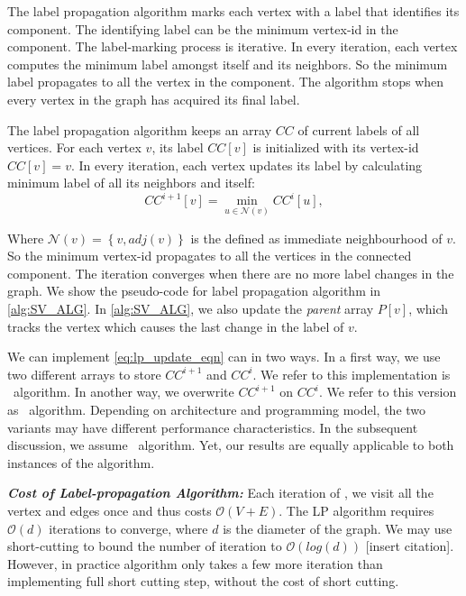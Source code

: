 \begin{table}



\end{table}

The label propagation algorithm marks each vertex with a label that identifies
its component. The identifying label can be the minimum vertex-id in the
component. The label-marking process is iterative. In every iteration, each
vertex computes the minimum label amongst itself and its neighbors. So the
minimum label propagates to all the vertex in the component. The algorithm
stops when every vertex in the graph has acquired its final label.

The label propagation algorithm keeps an array $CC$ of current labels of all
vertices. For each vertex $v$, its label $CC[v]$ is initialized with its
vertex-id $CC[v]=v$. In every iteration, each vertex updates its label by
calculating minimum label of all its neighbors and itself: 
%
\begin{equation}
CC^{i+1}[v]=\min_{u\in\mathcal{N}(v)}CC^{i}[u],\label{eq:lp_update_eqn}
\end{equation}

Where $\mathcal{N}(v)=\left\{ v,adj(v)\right\} $ is the defined as immediate
neighbourhood of $v$. So the minimum vertex-id propagates to all the vertices
in the connected component. The iteration converges when there are no more
label changes in the graph. We show the pseudo-code for label propagation algorithm in \cref{alg:SV_ALG}.
In \cref{alg:SV_ALG}, we also update the \emph{parent} array $P[v]$, which
tracks the vertex which causes the last change  in the label  of $v$. 

We can implement \cref{eq:lp_update_eqn} can in two ways. In a first way, we
use two different arrays to store $CC^{i+1}$ and $CC^{i}$. We refer to this
implementation is \synclp~algorithm. In another way, we overwrite $CC^{i+1}$
on $CC^{i}$. We refer to this version as \asynclp~algorithm. Depending on
architecture and programming model, the two variants may have different
performance characteristics. In the subsequent discussion, we assume
\asynclp~algorithm. Yet, our results are equally applicable to both instances
of the \sv algorithm.

\textbf{\emph{ Cost of Label-propagation Algorithm: }}
Each iteration of \sv, we visit all the vertex and edges once and thus
costs $\mathcal{O}(V+E)$. The LP algorithm requires $\mathcal{O}(d)$
iterations to converge, where $d$ is the diameter of the graph. We
may use short-cutting to bound the number of iteration to $\mathcal{O}(log(d))$
{[}insert citation{]}. However, in practice \asynclp algorithm only
takes a few more iteration than implementing full short cutting step,
without the cost of short cutting. 
